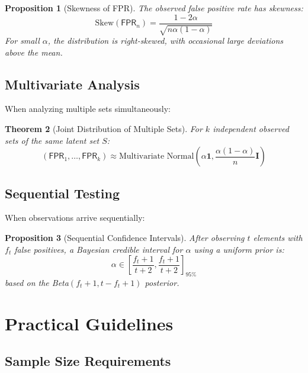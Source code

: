 \documentclass[11pt,final,hidelinks]{article}
\newtheorem{theorem}{Theorem}[section]
\newtheorem{proposition}[theorem]{Proposition}
\newcommand{\FPR}{\mathsf{FPR}}  %
\newcommand{\fprate}{\alpha}
\begin{document}
\begin{proposition}[Skewness of FPR]
The observed false positive rate has skewness:
\begin{equation}
\text{Skew}(\FPR_n) = \frac{1-2\fprate}{\sqrt{n\fprate(1-\fprate)}}
\end{equation}
For small $\fprate$, the distribution is right-skewed, with occasional large deviations above the mean.
\end{proposition}

\subsection{Multivariate Analysis}

When analyzing multiple sets simultaneously:

\begin{theorem}[Joint Distribution of Multiple Sets]
For $k$ independent observed sets of the same latent set $S$:
\begin{equation}
(\FPR_1, \ldots, \FPR_k) \approx \text{Multivariate Normal}(\fprate \mathbf{1}, \frac{\fprate(1-\fprate)}{n}\mathbf{I})
\end{equation}
\end{theorem}

\subsection{Sequential Testing}

When observations arrive sequentially:

\begin{proposition}[Sequential Confidence Intervals]
After observing $t$ elements with $f_t$ false positives, a Bayesian credible interval for $\fprate$ using a uniform prior is:
\begin{equation}
\fprate \in \left[\frac{f_t + 1}{t + 2}, \frac{f_t + 1}{t + 2}\right]_{95\%}
\end{equation}
based on the Beta$(f_t + 1, t - f_t + 1)$ posterior.
\end{proposition}

\section{Practical Guidelines}

\subsection{Sample Size Requirements}
\end{document}
